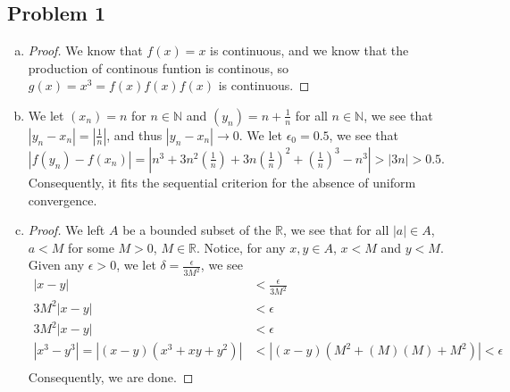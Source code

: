 \documentclass[12pt]{article}
\begin{document}
\subsection*{Problem 1}
\begin{enumerate}[a).]
    \item {
        \begin{proof}
        We know that $f(x) = x$ is continuous, and we know that the production of continous funtion is continous, 
        so $g(x) = x^3 = f(x)f(x)f(x)$ is continuous.
        \end{proof}
    }
    \item {
        We let $(x_n) = n$ for $n \in \mathbb{N}$ and $(y_n) = n + \frac{1}{n}$ for all $n \in \mathbb{N}$, we see that $|y_n - x_n| = |\frac{1}{n}|$, and thus $|y_n - x_n| \rightarrow 0$. 
        We let $\epsilon_0 = 0.5$, we see that $|f(y_n) - f(x_n)| = |n^3 + 3n^2(\frac{1}{n}) + 3n(\frac{1}{n})^2 + (\frac{1}{n})^3 - n^3| > |3n| > 0.5$. 
        Consequently, it fits the sequential criterion for the absence of uniform convergence. 
    }
    \item {
        \begin{proof}
        We left $A$ be a bounded subset of the $\mathbb{R}$, we see that for all $ |a| \in A$, $a < M$  for some $M >0$, $M \in \mathbb{R}$. 
        Notice, for any $x, y \in A$, $x < M$ and $y < M$. 
        Given any $\epsilon > 0$, we let $\delta = \frac{\epsilon}{3M^2}$, we see
        \begin{align*}
            |x-y| &< \frac{\epsilon}{3M^2} \\
            3M^2|x-y| &< \epsilon \\
            3M^2|x-y| &< \epsilon \\
            |x^3 - y^3|= |(x-y)(x^3 + xy + y^2)|&<|(x-y) (M^2 + (M)(M) + M^2)| < \epsilon \\
        \end{align*}
        Consequently, we are done. 
        \end{proof}
    }
\end{enumerate}
\end{document}
